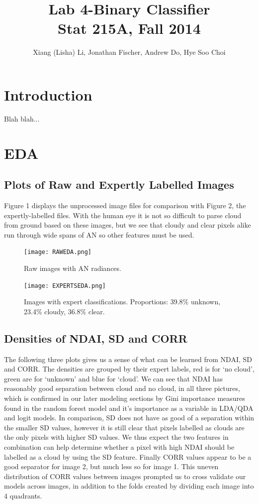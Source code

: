 \documentclass{article}\usepackage[]{graphicx}\usepackage[]{color}
\begin{document}
\title{Lab 4-Binary Classifier\\
Stat 215A, Fall 2014}

\author{Xiang (Lisha) Li, Jonathan Fischer, Andrew Do, Hye Soo Choi}

\maketitle

\section{Introduction}
Blah blah...

\section{EDA}

\subsection{Plots of Raw and Expertly Labelled Images}
Figure 1 displays the unprocessed image files for comparison with Figure 2, the expertly-labelled files. With the human eye it is not so difficult to parse cloud from ground based on these images, but we see that cloudy and clear pixels alike run through wide spans of AN so other features must be used.
\begin{figure}[H]
\texttt{[image: RAWEDA.png]}
\caption{Raw images with AN radiances.}
\end{figure}

\begin{figure}[H]
\texttt{[image: EXPERTSEDA.png]}
\caption{Images with expert classifications. Proportions: 39.8$\%$ unknown, 23.4$\%$ cloudy, 36.8$\%$ clear.}
\end{figure}
\subsection{Densities of NDAI, SD and CORR}

The following three plots gives us a sense of what can be learned from NDAI, SD and CORR.  The densities are grouped by their expert labels, red is for `no cloud', green are for `unknown' and blue for `cloud'. We can see that NDAI has reasonably good separation between cloud and no cloud, in all three pictures, which is confirmed in our later modeling sections by Gini importance measures found in the random forest model and it's importance as a variable in LDA/QDA and logit models. In comparison, SD does not have as  good of a separation within the smaller SD values, however it is still clear that pixels labelled as clouds are the only pixels with higher SD values.  We thus expect the two features in combination can help determine whether a pixel with high NDAI should be labelled as a cloud by using the SD feature.  Finally CORR values appear to be a good separator for image 2, but much less so for image 1.  This uneven distribution of CORR values between images prompted us to cross validate our models across images, in addition to the folds created by dividing each image into 4 quadrants. 
\end{document}
